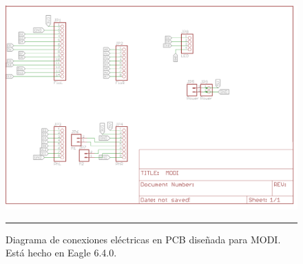 \begin{figure}[htbp]
	\centering
\includegraphics[width=\textwidth]{./Figures/MODI/circuitoPCB.png}
		\rule{35em}{0.5pt}
	\caption[Diagrama eléctrico de conexiones en PCB MODI]{Diagrama de conexiones eléctricas en PCB diseñada para MODI. Está hecho en Eagle 6.4.0.}
	\label{fig:Historia}
\end{figure}
